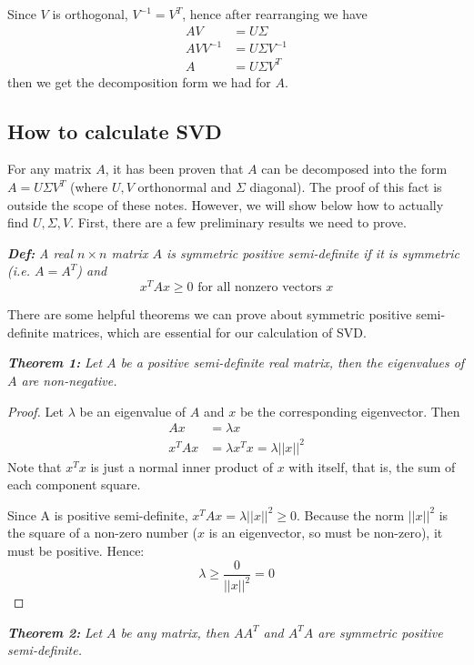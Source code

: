 \documentclass{article}
\begin{document}
Since $V$ is orthogonal, $V^{-1} = V^T$, hence after rearranging we have
\begin{align*}
AV &= U \Sigma \\
AV V^{-1} &= U \Sigma V^{-1} \\
A &= U\Sigma V^T
\end{align*}
then we get the decomposition form we had for $A$.

\subsection{How to calculate SVD}
For any matrix $A$, it has been proven that $A$ can be decomposed into the form $A = U \Sigma V^T$ (where $U,V$ orthonormal and $\Sigma$ diagonal). The proof of this fact is outside the scope of these notes. However, we will show below how to actually find $U, \Sigma, V$. First, there are a few preliminary results we need to prove.
\bigskip

\textit{\textbf{Def:}} \textit{A real $n \times n$ matrix $A$ is symmetric positive semi-definite if it is symmetric (i.e. $A=A^T$) and 
$$ x^T A x \geq 0 \text{ for all nonzero vectors }x$$}
\bigskip

There are some helpful theorems we can prove about symmetric positive semi-definite matrices, which are essential for our calculation of SVD.
\bigskip

\textit{\textbf{Theorem 1:}} \textit{Let $A$ be a positive semi-definite real matrix, then the eigenvalues of $A$ are non-negative.}

\begin{proof}
Let $\lambda$ be an eigenvalue of $A$ and $x$ be the corresponding eigenvector. Then 
\begin{align*}
Ax &=\lambda x \\
x^T A x &= \lambda x^Tx  = \lambda || x ||^2 
\end{align*}
Note that $x^T x$ is just a normal inner product of $x$ with itself, that is, the sum of each component square.
  
Since A is positive semi-definite, $x^T A x =\lambda ||x||^2 \geq 0$. Because the norm $||x||^2 $ is the square of a non-zero number ($x$ is an eigenvector, so must be non-zero), it must be positive. Hence: $$\lambda \geq \frac{0}{||x||^2} = 0$$
\end{proof}
\bigskip

\textit{\textbf{Theorem 2:}} \textit{Let $A$ be any matrix, then $AA^T$ and $A^TA$ are symmetric positive semi-definite.}
\end{document}
